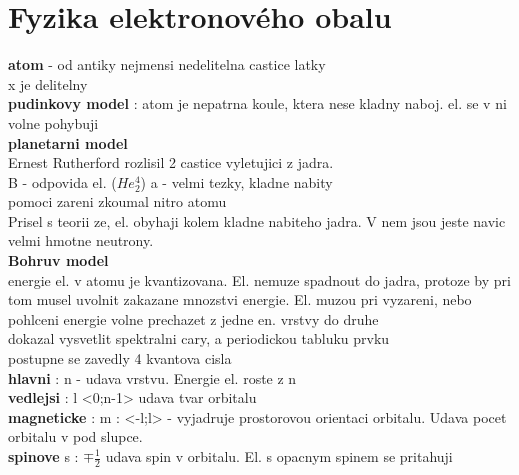 \documentclass{report}
\begin{document}


\newpage


\section{Fyzika elektronového obalu}

\vspace{0.5cm}
\textbf{atom} - od antiky nejmensi nedelitelna castice latky \\
x je delitelny \\
\textbf{pudinkovy model} : atom je nepatrna koule, ktera nese kladny naboj. el. se v ni volne 
pohybuji \\
\textbf{planetarni model} \\
Ernest Rutherford rozlisil 2 castice vyletujici z jadra. \\
B - odpovida el. ($He^{4}_2$) a - velmi tezky, kladne nabity \\
pomoci zareni zkoumal nitro atomu \\
Prisel s teorii ze, el. obyhaji kolem kladne nabiteho jadra. V nem jsou jeste navic velmi hmotne neutrony. \\
\textbf{Bohruv model} \\
energie el. v atomu je kvantizovana. El. nemuze spadnout do jadra, protoze by pri tom musel uvolnit zakazane mnozstvi energie. El. muzou pri vyzareni, nebo pohlceni energie volne prechazet z jedne en. vrstvy do druhe \\
dokazal vysvetlit spektralni cary, a periodickou tabluku prvku \\
postupne se zavedly 4 kvantova cisla \\
\textbf{hlavni} : n - udava vrstvu. Energie el. roste z n \\
\textbf{vedlejsi} : l <0;n-1> udava tvar orbitalu \\
\textbf{magneticke} : m : <-l;l> - vyjadruje prostorovou orientaci orbitalu. Udava pocet orbitalu v pod slupce. \\
\textbf{spinove} s : $\mp \frac{1}{2}$ udava spin v orbitalu. El. s opacnym spinem se pritahuji \\
\end{document}
